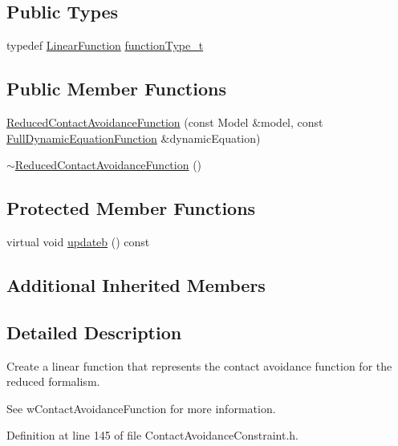 \subsection*{Public Types}
\begin{DoxyCompactItemize}
\item 
typedef \hyperlink{classocra_1_1LinearFunction}{Linear\+Function} \hyperlink{classocra_1_1ReducedContactAvoidanceFunction_ae1d0c9b1c213515eabdb15cb7dc82869}{function\+Type\+\_\+t}
\end{DoxyCompactItemize}
\subsection*{Public Member Functions}
\begin{DoxyCompactItemize}
\item 
\hyperlink{classocra_1_1ReducedContactAvoidanceFunction_ae2183d53a13985590ee4f5cf59083803}{Reduced\+Contact\+Avoidance\+Function} (const Model \&model, const \hyperlink{classocra_1_1FullDynamicEquationFunction}{Full\+Dynamic\+Equation\+Function} \&dynamic\+Equation)
\item 
\hyperlink{classocra_1_1ReducedContactAvoidanceFunction_a7a1844143947f714f2e0207d9f56834a}{$\sim$\+Reduced\+Contact\+Avoidance\+Function} ()
\end{DoxyCompactItemize}
\subsection*{Protected Member Functions}
\begin{DoxyCompactItemize}
\item 
virtual void \hyperlink{classocra_1_1ReducedContactAvoidanceFunction_ac39227a19a650de28f4ae603511bfb73}{updateb} () const
\end{DoxyCompactItemize}
\subsection*{Additional Inherited Members}


\subsection{Detailed Description}
Create a linear function that represents the contact avoidance function for the reduced formalism. 

See w\+Contact\+Avoidance\+Function for more information. 

Definition at line 145 of file Contact\+Avoidance\+Constraint.\+h.



